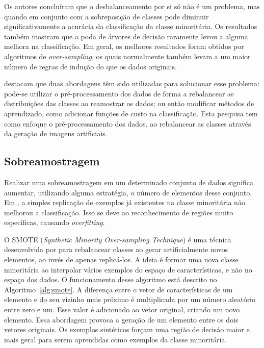 Os autores concluíram que o desbalanceamento por si só não é um problema, mas quando em conjunto com a sobreposição de classes pode diminuir significativamente a acurácia da classificação da classe minoritária. Os resultados também mostram que a poda de árvores de decisão raramente levou a alguma melhora na classificação. Em geral, os melhores resultados foram obtidos por algoritmos de \textit{over-sampling}, os quais normalmente também levam a um maior número de regras de indução do que os dados originais.


 destacam que duas abordagens têm sido utilizadas para solucionar esse problema: pode-se utilizar o pré-processamento dos dados de forma a rebalancear as distribuições das classes ao reamostrar os dados; ou então modificar métodos de aprendizado, como adicionar funções de custo na classificação. Esta pesquisa tem como enfoque o pré-processamento dos dados, ao rebalancear as classes através da geração de imagens artificiais.

\subsection{Sobreamostragem}
\label{sec:smote}

Realizar uma sobreamostragem em um determinado conjunto de dados significa aumentar, utilizando alguma estratégia, o número de elementos desse conjunto. Em , a simples replicação de exemplos já existentes na classe minoritária não melhorou a classificação. Isso se deve ao reconhecimento de regiões muito específicas, causando \textit{overfitting}.

O SMOTE (\textit{Synthetic Minority Over-sampling Technique}) é uma técnica desenvolvida por  para rebalancear classes ao gerar artificialmente novos elementos, ao invés de apenas replicá-los. A ideia é formar uma nova classe minoritária ao interpolar vários exemplos do espaço de características, e não no espaço dos dados. O funcionamento desse algoritmo está descrito no Algoritmo~\ref{alg:smote}. A diferença entre o vetor de características de um elemento e do seu vizinho mais próximo é multiplicada por um número aleatório entre zero e um. Esse valor é adicionado ao vetor original, criando um novo elemento. Essa abordagem provoca a geração de um elemento entre os dois vetores originais. Os exemplos sintéticos forçam uma região de decisão maior e mais geral para serem aprendidas como exemplos da classe minoritária.

